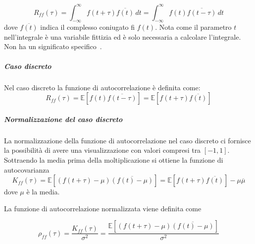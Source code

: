 \[R_{ff}(\tau) = \int_{-\infty}^{\infty} f(t+\tau) \overline{f(t)}  \,dt =  \int_{-\infty}^{\infty} f(t) \overline{f(t-\tau)}  \,dt \]
dove $\overline{f(t)}$ indica il complesso coniugato fi $f(t)$. 
Nota come il parametro $t$ nell'integrale è una variabile fittizia ed è solo necessaria
a calcolare l'integrale. Non ha un significato specifico~\cite{wiki:autcor_en}.

\subparagraph*{Caso discreto}
Nel caso discreto la funzione di autocorrelazione è definita come:
\[ R_{ff}(\tau) = \mathbb{E} \left[ f(t) \overline{f(t-\tau)} \right] = \mathbb{E} \left[ f(t + \tau) \overline{f(t)} \right] \] 

\subparagraph*{Normalizzazione del caso discreto}
La normalizzazione della funzione di autocorrelazione nel caso discreto ci fornisce la 
possibilità di avere una visualizzazione con valori compresi tra $[-1, 1]$. 
Sottraendo la media prima della moltiplicazione si ottiene la funzione di autocovarianza 
\[ 
K_{ff}(\tau) = 
\mathbb{E} \left[ \left( f(t + \tau) - \mu \right) \overline{ \left( f(t) - \mu \right) } \right] =  
\mathbb{E} \left[ f(t + \tau) \overline{ f(t) } \right] - \mu\overline{\mu} 
\] 
dove $\mu$ è la media.


La funzione di autocorrelazione normalizzata viene definita come 

\[ 
\rho_{ff}(\tau) = \frac{K_{ff}(\tau)}{\sigma^2} = 
\frac{\mathbb{E} \left[ \left( f(t + \tau) - \mu \right) \overline{ \left( f(t) - \mu \right) } \right]}{\sigma^2}
\] 



